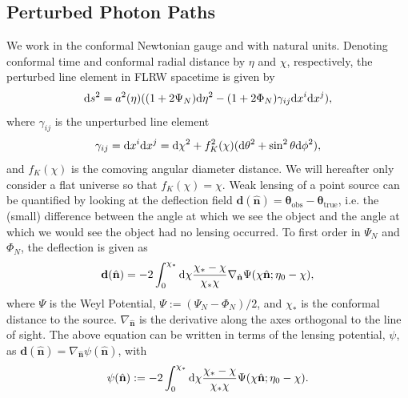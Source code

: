 \documentclass[11pt]{article} %
\DeclareRobustCommand{\d}{\ifmmode\text{d}\else d\fi}
\begin{document}
\subsection{Perturbed Photon Paths}
We work in the conformal Newtonian gauge and with natural units. Denoting conformal time and conformal radial distance by $\eta$ and $\chi$, respectively, the perturbed line element in FLRW spacetime is given by
\begin{equation}
    \d s^2 = a^2(\eta)((1 + 2\Psi_N) \d \eta^2 - (1 + 2\Phi_N) \gamma_{ij}\d x^i \d x^j),
\end{equation}
where $\gamma_{ij}$ is the unperturbed line element
\begin{equation}
    \gamma_{ij} = \d x^i \d x^j = \d \chi^2 + f^2_K(\chi)(\d \theta^2 + \sin ^2 \theta \d \phi ^2),
\end{equation}
and $f_K(\chi)$ is the comoving angular diameter distance. We will hereafter only consider a flat universe so that $f_K(\chi) = \chi$. Weak lensing of a point source can be quantified by looking at the deflection field $\mathbf d (\hat{\mathbf n}) = \mathbf \theta_{\text{obs}} - \mathbf \theta_{\text{true}}$, i.e. the (small) difference between the angle at which we see the object and the angle at which we would see the object had no lensing occurred. To first order in $\Psi_N$ and $\Phi_N$, the deflection is given as \cite{dodelson2020modern}
\begin{equation}
    \mathbf d(\hat{\mathbf n}) = -2 \int_0^{\chi_*}\d \chi \frac{\chi_* - \chi}{\chi_*\chi}\nabla_{\hat{\mathbf n}}\Psi(\chi\hat{\mathbf n};\eta_0 - \chi),
\end{equation}
where $\Psi$ is the Weyl Potential, $\Psi := (\Psi_N - \Phi_N)/2$, and $\chi_*$ is the conformal distance to the source. $\nabla_{\hat{\mathbf n}}$ is the derivative along the axes orthogonal to the line of sight. The above equation can be written in terms of the lensing potential, $\psi$, as $\mathbf d (\hat{\mathbf n}) = \nabla_{\hat{\mathbf n}} \psi(\hat{\mathbf n})$, with
\begin{equation}
    \psi(\hat {\mathbf n}) := -2 \int_0^{\chi_*}\d \chi \frac{\chi_* - \chi}{\chi_*\chi}\Psi(\chi\hat{\mathbf n};\eta_0 - \chi).
\end{equation}
\end{document}
